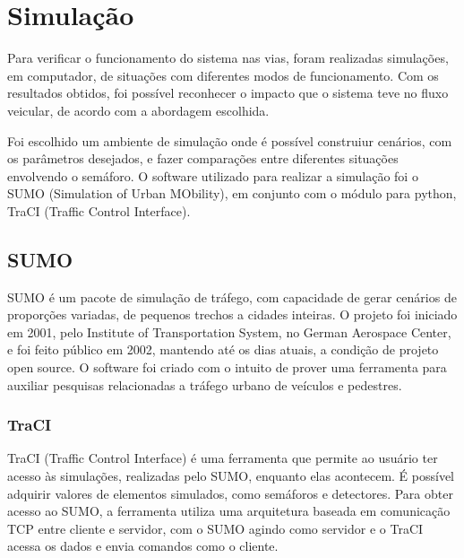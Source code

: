 \chapter{Simulação}

Para verificar o funcionamento do sistema nas vias, foram realizadas simulações, em computador, de situações com diferentes modos de funcionamento. Com os resultados obtidos, foi possível reconhecer o impacto que o sistema teve no fluxo veicular, de acordo com a abordagem escolhida.

Foi escolhido um ambiente de simulação onde é possível construiur cenários, com os parâmetros desejados, e fazer comparações entre diferentes situações envolvendo o semáforo.
O software utilizado para realizar a simulação foi o SUMO (Simulation of Urban MObility), em conjunto com o módulo para python, TraCI (Traffic Control Interface).

\section{SUMO}
SUMO é um pacote de simulação de tráfego, com capacidade de gerar cenários de proporções variadas, de pequenos trechos a cidades inteiras. O projeto foi iniciado em 2001, pelo Institute of Transportation System, no German Aerospace Center, e foi feito público em 2002, mantendo até os dias atuais, a condição de projeto open source.
O software foi criado com o intuito de prover uma ferramenta para auxiliar pesquisas relacionadas a tráfego urbano de veículos e pedestres. 
  
\subsection{TraCI}  

TraCI (Traffic Control Interface) é uma ferramenta que permite ao usuário ter acesso às simulações, realizadas pelo SUMO, enquanto elas acontecem. É possível adquirir valores de elementos simulados, como semáforos e detectores.
Para obter acesso ao SUMO, a ferramenta utiliza uma arquitetura baseada em comunicação TCP entre cliente e servidor, com o SUMO agindo como servidor e o TraCI acessa os dados e envia comandos como o cliente.

